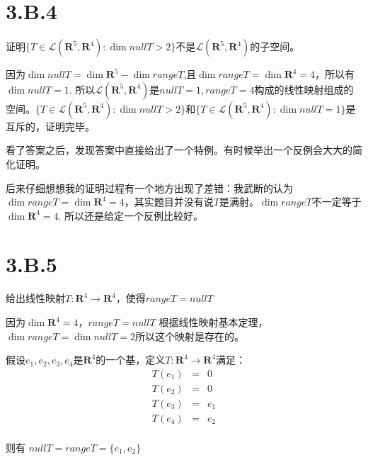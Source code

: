 \documentclass[10pt,a4paper,UTF8]{article}
\begin{document}
\section{3.B.4}
\label{sec:org508de5d}


\begin{problem}
证明\(\{T\in \mathcal{L}(\mathbf{R}^{5}, \mathbf{R}^{4}):\dim nullT >2\}\)不是\(\mathcal{L}(\mathbf{R}^{5}, \mathbf{R}^{4})\)的子空间。
\end{problem}

\begin{answer}
因为\(\dim nullT = \dim \mathbf{R}^{5} - \dim rangeT\),且\(\dim range T = \dim \mathbf{R}^{4} = 4\)，所以有\(\dim nullT = 1\). 所以\(\mathcal{L}(\mathbf{R}^{5}, \mathbf{R}^{4})\)是\(nullT =1,rangeT=4\)构成的线性映射组成的空间。\(\{T\in \mathcal{L}(\mathbf{R}^{5}, \mathbf{R}^{4}):\dim nullT >2\}\)和\(\{T\in \mathcal{L}(\mathbf{R}^{5}, \mathbf{R}^{4}):\dim nullT =1\}\)是互斥的，证明完毕。

看了答案之后，发现答案中直接给出了一个特例。有时候举出一个反例会大大的简化证明。

后来仔细想想我的证明过程有一个地方出现了差错：我武断的认为\(\dim range T = \dim \mathbf{R}^{4} = 4\)，其实题目并没有说\(T\)是满射。\(\dim range T\)不一定等于\(\dim \mathbf{R}^{4} = 4\). 所以还是给定一个反例比较好。
\end{answer}

\section{3.B.5}
\label{sec:orgb6e0e43}


\begin{problem}
给出线性映射\(T: \mathbf{R}^{4} \rightarrow \mathbf{R}^{4}\)，使得\(range T = null T\)
\end{problem}

\begin{answer}
因为\(\dim \mathbf{R}^{4} = 4\)，\(range T = null T\) 根据线性映射基本定理，\(\dim range T = \dim null T = 2\)所以这个映射是存在的。

假设\(e_{1},e_{2},e_{3},e_{4}\)是\(\mathbf{R}^{4}\)的一个基，定义\(T: \mathbf{R}^{4} \rightarrow \mathbf{R}^{4}\)满足：
\begin{eqnarray*}
T(e_{1})&=& 0\\
T(e_{2})&=& 0\\
T(e_{3})&=& e_{1}\\
T(e_{4})&=& e_{2}\\
\end{eqnarray*}

则有 \(nullT = range T = \{e_{1},e_{2}\}\)
\end{answer}
\end{document}
